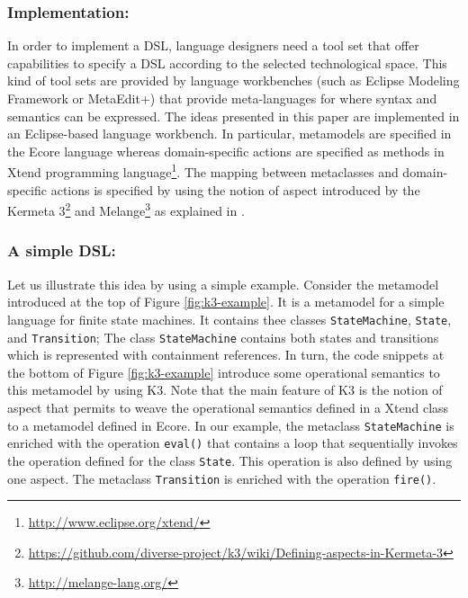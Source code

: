 \subsubsection{Implementation:} In order to implement a DSL, language designers need a tool set that offer capabilities to specify a DSL according to the selected technological space. This kind of tool sets are provided by language workbenches (such as Eclipse Modeling Framework or MetaEdit+) that provide meta-languages for where syntax and semantics can be expressed. The ideas presented in this paper are implemented in an Eclipse-based language workbench. In particular, metamodels are specified in the Ecore language whereas domain-specific actions are specified as methods in Xtend programming language\footnote{\url{http://www.eclipse.org/xtend/}}. The mapping between metaclasses and domain-specific actions is specified by using the notion of aspect introduced by the Kermeta 3\footnote{\url{https://github.com/diverse-project/k3/wiki/Defining-aspects-in-Kermeta-3}} and Melange\footnote{\url{http://melange-lang.org/}} as explained in \cite{degueule:2015}. 

\vspace{-3mm}
\subsubsection{A simple DSL:} Let us illustrate this idea by using a simple example. Consider the metamodel introduced at the top of Figure \ref{fig:k3-example}. It is a metamodel for a simple language for finite state machines. It contains thee classes \texttt{StateMachine}, \texttt{State}, and \texttt{Transition}; The class \texttt{StateMachine} contains both states and transitions which is represented with containment references. In turn, the code snippets at the bottom of Figure \ref{fig:k3-example} introduce some operational semantics to this metamodel by using K3. Note that the main feature of K3 is the notion of aspect that permits to weave the operational semantics defined in a Xtend class to a metamodel defined in Ecore. In our example, the metaclass \texttt{StateMachine} is enriched with the operation \texttt{eval()} that contains a loop that sequentially invokes the operation defined for the class \texttt{State}. This operation is also defined by using one aspect. The metaclass \texttt{Transition} is enriched with the operation \texttt{fire()}.

